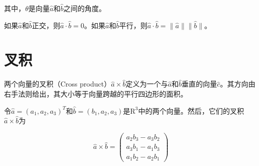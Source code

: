 

其中，$\theta$是向量$\hat{a}$和$\hat{b}$之间的角度。

如果$\hat{a}$和$\hat{b}$正交，则$\hat{a}\cdot\hat{b}=0$。如果$\hat{a}$和$\hat{b}$平行，则$\hat{a}\cdot\hat{b}=\|\hat{a}\|\|\hat{b}\|$。



\section{叉积}
两个向量的叉积（Cross product）$\hat{a}\times\hat{b}$定义为一个与$\hat{a}$和$\hat{b}$垂直的向量$\hat{c}$。其方向由右手法则给出，其大小等于向量跨越的平行四边形的面积。

令$\hat{a}=(a_1,a_2,a_3)^T$和$\hat{b}=(b_1,a_2,a_3)$是$\mathrm{R}^3$中的两个向量。然后，它们的叉积$\hat{a}\times\hat{b}$为

\begin{equation}
\hat{a}\times\hat{b}=\left(
\begin{array}{l}
a_2b_3-a_3b_2\\
a_3b_1-a_1b_3\\
a_1b_2-a_2b_1
\end{array}
\right)
\end{equation}



